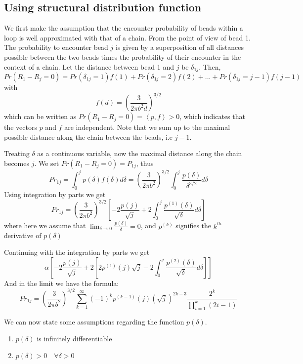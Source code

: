 \documentclass[12pt]{article}
\begin{document}
\subsection{Using structural distribution function}
We first make the assumption that the encounter probability of beads within a loop is well approximated with that of a chain. From the point of view of bead 1. The probability to encounter bead $j$ is given by a superposition of all distances possible between the two beads times the probability of their encounter in the context of a chain. Let the distance between bead 1 and $j$ be $\delta_{1j}$. Then,
\begin{equation*}
Pr(R_1-R_j=0)=Pr(\delta_{1j}=1)f(1)+Pr(\delta_{1j}=2)f(2)+...+Pr(\delta_{1j}=j-1)f(j-1)
\end{equation*}
with 
\begin{equation*}
f(d) = \left(\frac{3}{2\pi b^2 d}\right)^{3/2}
\end{equation*}
which can be written as $Pr(R_1-R_j=0)=\left<p,f\right> >0$, which indicates that the vectors $p$ and $f$ are independent. Note that we sum up to the maximal possible distance along the chain between the beads, i.e $j-1$.

Treating $\delta$ as a continuous variable, now the maximal distance along the chain becomes $j$. We set $Pr(R_1-R_j=0)=P_{1j}$, thus
\begin{equation*}
Pr_{1j}= \int_{0}^{j} p(\delta)f(\delta)d\delta= \left(\frac{3}{2\pi b^2}\right)^{3/2}\int_0^{j} \frac{p(\delta)}{\delta^{3/2}}d\delta
\end{equation*}
Using integration by parts we get 
\begin{equation}
Pr_{1j}=\left(\frac{3}{2\pi b^2}\right)^{3/2}\left[ -2\frac{p(j)}{\sqrt{j}}+2\int_0^{j}\frac{p^{(1)}(\delta)}{\sqrt{\delta}}d\delta  \right]
\end{equation}
where here we assume that $\lim_{\delta\rightarrow 0}\frac{p(\delta)}{\delta}=0$, and $p^{(k)}$ signifies the $k^{th}$ derivative of $p(\delta)$

Continuing with the integration by parts we get 
\begin{equation*}
\alpha\left[ -2\frac{p(j)}{\sqrt{j}}+2[2p^{(1)}(j)\sqrt{j}-2\int_0^{j}\frac{p^{(2)}(\delta)}{\sqrt{\delta}}d\delta]  \right]
\end{equation*}
And in the limit we have the formula:
\begin{equation*}
Pr_{1j}=\left(\frac{3}{2\pi b^2}\right)^{3/2}\sum_{k=1}^\infty (-1)^k p^{(k-1)}(j)\left(\sqrt{j}\right)^{2k-3} \frac{2^k}{\prod_{i=1}^k (2i-1)}
\end{equation*} 

We can now state some assumptions regarding the function $p(\delta)$.
\begin{enumerate}
	\item $p(\delta)$ is infinitely differentiable
	\item $p(\delta)>0 \quad  \forall \delta >0$
\end{enumerate}





\end{document}
